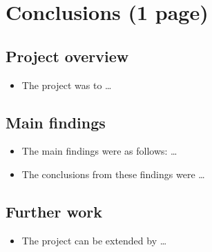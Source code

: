 \documentclass[12pt,a4paper]{article}
\begin{document}
\section{Conclusions (1 page)}
\subsection{Project overview}
\begin{itemize}
    \item The project was to \dots
\end{itemize}

\subsection{Main findings}
\begin{itemize}
    \item The main findings were as follows: \dots
    \item The conclusions from these findings were \dots
\end{itemize}

\subsection{Further work}
\begin{itemize}
    \item The project can be extended by \dots
\end{itemize}

\cite{}

\end{document}

